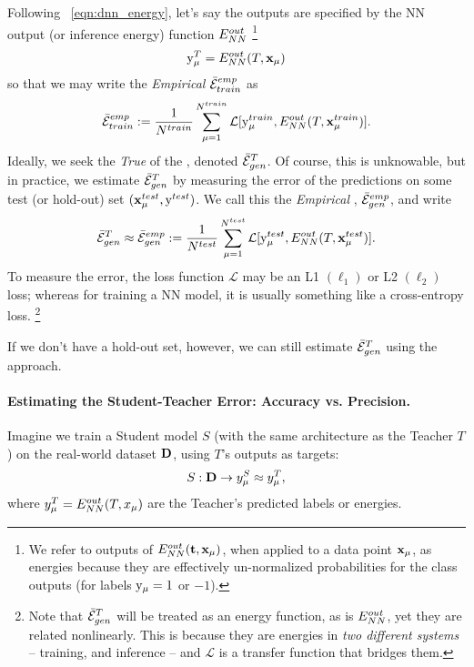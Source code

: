Following \EQN~\ref{eqn:dnn_energy}, let's say the \Teacher outputs are specified by
the NN output (or inference energy) function $E^{out}_{NN}$
\footnote{
We refer to outputs of $E^{out}_{NN}({\mathbf{t}},\mathbf{x}_{\mu} )$, when applied to a data point $\mathbf{x}_{\mu}$, as energies because they are effectively un-normalized probabilities for the class outputs (for labels $\mathrm{y}_{\mu}=1$ or $-1$).  }
\begin{align}
\label{eqn:T_ENN}
\mathrm{y}_{\mu}^{T}=E^{out}_{NN}(T,\mathbf{x}_{\mu}) 
\end{align}
so that we may write the \emph{Empirical} \AverageTrainingError
$\bar{\mathcal{E}}^{emp}_{train}$
as 
\begin{align}
\label{eqn:Eg_train}
\bar{\mathcal{E}}^{emp}_{train}:= \frac{1}{N^{train}}\sum_{\mu=1}^{N^{train}}\mathcal{L}[\mathrm{y}_{\mu}^{train},E^{out}_{NN}(T,\mathbf{x}_{\mu}^{train})]  .
\end{align}
Ideally, we seek the \emph{True} \AverageGeneralizationError of the \Teacher, denoted  $\bar{\mathcal{E}}_{gen}^{T}$. 
Of course, this is unknowable, but in practice, we estimate $\bar{\mathcal{E}}_{gen}^{T}$ 
by measuring the error of the \Teacher predictions on some test (or hold-out) set $(\mathbf{x}_{\mu}^{test}, \mathrm{y}^{test})$.
We call this the \emph{Empirical \AverageGeneralizationError}, $\bar{\mathcal{E}}^{emp}_{gen}$, and write
\begin{align}
\label{eqn:Eg_test}
 \bar{\mathcal{E}}_{gen}^{T}\approx \bar{\mathcal{E}}^{emp}_{gen}:= \frac{1}{N^{test}}\sum_{\mu=1}^{N^{test}}\mathcal{L}[\mathrm{y}_{\mu}^{test},E^{out}_{NN}(T,\mathbf{x}_{\mu}^{test})] .
\end{align}
To measure the error, the loss function $\mathcal{L}$ may be an L1 $(\ell_1)$ or L2 $(\ell_2)$ loss;
whereas for training a NN model, it is usually something like a cross-entropy loss.
\footnote{Note that $\bar{\mathcal{E}}_{gen}^{T}$ will be treated as an energy function, as is $E^{out}_{NN}$, yet they are related nonlinearly. This is because they are energies in \emph{two different systems} -- training, and inference -- and $\mathcal{L}$ is a transfer function that bridges them.}

If we don't have a hold-out set, however, we can still estimate $\bar{\mathcal{E}}_{gen}^{T}$ using the \StudentTeacher approach.

\paragraph{Estimating the Student-Teacher Error: Accuracy vs. Precision.}
Imagine we train a Student model $S$ (with the same architecture as the Teacher $T$) on the real-world dataset $\mathbf{D}$, using $T$'s outputs as targets:
\begin{equation*}
S: \mathbf{D} \to y^{S}_\mu \approx y^{T}_\mu,
\label{eqn:S_ENN}
\end{equation*}
where $y^T_\mu = E^{out}_{NN}(T, x_\mu)$ are the Teacher’s predicted labels or energies.

